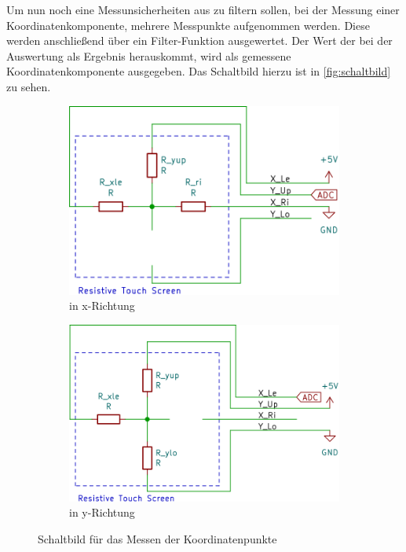 Um nun noch eine Messunsicherheiten aus zu filtern sollen, bei der Messung einer Koordinatenkomponente, mehrere Messpunkte aufgenommen werden.
Diese werden anschließend über ein Filter-Funktion ausgewertet.
Der Wert der bei der Auswertung als Ergebnis herauskommt, wird als gemessene Koordinatenkomponente ausgegeben.
Das Schaltbild hierzu ist in \cref{fig:schaltbild} zu sehen.

\begin{figure}[ht!]
    \begin{subfigure}{0.49\textwidth}
        \centering
        \includegraphics[width=\textwidth]{fig/xlesen.png}
        \caption{in x-Richtung}
        \label{fig:xlesen}
    \end{subfigure}
    \hfill
    \begin{subfigure}{0.49\textwidth}
        \centering
        \includegraphics[width=\textwidth]{fig/ylesen.png}
        \caption{in y-Richtung}
        \label{fig:ylesen}
    \end{subfigure}
    \caption{Schaltbild für das Messen der Koordinatenpunkte}
    \label{fig:xylesen}
\end{figure}
